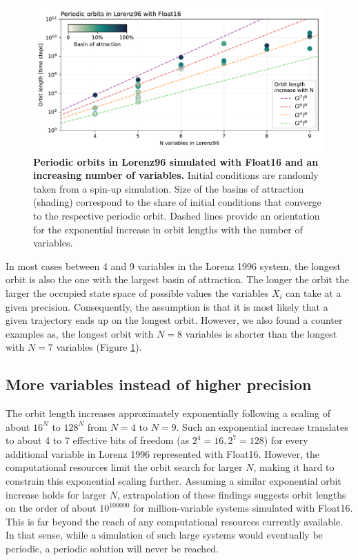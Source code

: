 \begin{figure}[tbhp]
	\includegraphics[width=1\textwidth]{Figures/orbits/L96_orbits.pdf}
	\caption{\textbf{Periodic orbits in Lorenz96 simulated with Float16 and an increasing number of
	variables.} Initial conditions are randomly taken from a spin-up simulation. Size of the basins of
	attraction (shading) correspond to the share of initial conditions that converge to the respective
	periodic orbit. Dashed lines provide an orientation for the exponential increase in orbit lengths
	with the number of variables.}
	\label{fig:L96_orbits}
\end{figure}

In most cases between 4 and 9 variables in the Lorenz 1996 system, the longest orbit is also the one with the largest basin of attraction.
The longer the orbit the larger the occupied state space of possible values the variables $X_i$ can take at a given precision. Consequently,
the assumption is that it is most likely that a given trajectory ends up on the longest orbit. However, we also found a counter examples as, 
the longest orbit with $N=8$ variables is shorter than the longest with $N=7$ variables (Figure \ref{fig:L96_orbits}).

\subsection{More variables instead of higher precision}

The orbit length increases approximately exponentially following a scaling of about $16^N$ to $128^N$  from $N=4$ to $N=9$.
Such an exponential increase translates to about 4 to 7 effective bits of freedom (as $2^4=16, 2^7=128$) for every additional
variable in Lorenz 1996 represented with Float16. However, the computational resources limit the orbit search for larger $N$, making
it hard to constrain this exponential scaling further. Assuming a similar exponential orbit increase holds for larger $N$, extrapolation
of these findings suggests orbit lengths on the order of about $10^{100000}$ for million-variable systems simulated with Float16.
This is far beyond the reach of any computational resources currently available. In that sense, while a simulation of such large
systems would eventually be periodic, a periodic solution will never be reached.

